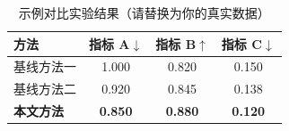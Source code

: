 \begin{table}[htbp]
    \centering\small
    \caption{示例对比实验结果（请替换为你的真实数据）}
    \label{tab:example}
    \renewcommand{\arraystretch}{1.2}
    \setlength{\tabcolsep}{9pt}
    \begin{tabular}{lccc}
        \toprule
        \textbf{方法} & \textbf{指标 A}$\downarrow$ & \textbf{指标 B}$\uparrow$ & \textbf{指标 C}$\downarrow$ \\
        \midrule
        基线方法一   & 1.000 & 0.820 & 0.150 \\
        基线方法二   & 0.920 & 0.845 & 0.138 \\
        \midrule
        \textbf{本文方法} & \textbf{0.850} & \textbf{0.880} & \textbf{0.120} \\
        \bottomrule
    \end{tabular}
\end{table}
